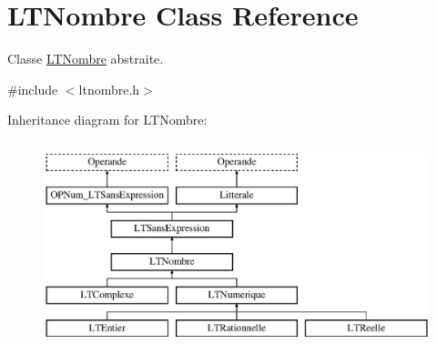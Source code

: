 \hypertarget{class_l_t_nombre}{}\section{L\+T\+Nombre Class Reference}
\label{class_l_t_nombre}


Classe \hyperlink{class_l_t_nombre}{L\+T\+Nombre} abstraite.  




{\ttfamily \#include $<$ltnombre.\+h$>$}

Inheritance diagram for L\+T\+Nombre\+:\begin{figure}[H]
\begin{center}
\leavevmode
\includegraphics[height=6.000000cm]{class_l_t_nombre}
\end{center}
\end{figure}
